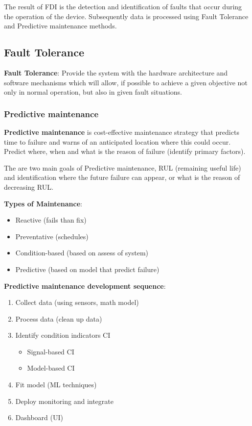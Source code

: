 \documentclass[class=article, crop=false]{standalone}
\begin{document}
The result of FDI is the detection and identification of faults that occur
during the operation of the device. Subsequently data is processed using
Fault Tolerance and Predictive maintenance methods.


\subsection{Fault Tolerance}
\textbf{Fault Tolerance}: Provide the system with the hardware architecture and
  software mechanisms which will allow, if possible to achieve a given
  objective not only in normal operation, but also in given fault
  situations.


\subsubsection{Predictive maintenance}
\textbf{Predictive maintenance} is cost-effective maintenance strategy that
predicts time to failure and warns of an anticipated location where this
could occur.
Predict where, when and what is the reason of failure (identify primary
factors).

The are two main goals of Predictive maintenance, RUL (remaining useful
life) and identification where the future failure can appear, or what is
the reason of decreasing RUL.



\textbf{Types of Maintenance}:
\begin{itemize}
    \item{Reactive (fails than fix)}
    \item{Preventative (schedules)}
    \item{Condition-based (based on assess of system)}
    \item{Predictive (based on model that predict failure)}
\end{itemize}

\textbf{Predictive maintenance development sequence}:
\begin{enumerate}
    \item{Collect data (using sensors, math model)}
    \item{Process data (clean up data)}
    \item{Identify condition indicators CI}
        \begin{itemize}
            \item{Signal-based CI}
            \item{Model-based CI}
        \end{itemize}
    \item{Fit model (ML techniques)}
    \item{Deploy monitoring and integrate}
    \item{Dashboard (UI)}
\end{enumerate}
\end{document}
